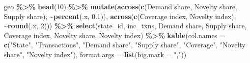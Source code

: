 \documentclass[
]{article}
\newenvironment{Shaded}{\begin{snugshade}}{\end{snugshade}}
\newcommand{\AttributeTok}[1]{\textcolor[rgb]{0.13,0.29,0.53}{#1}}
\newcommand{\DecValTok}[1]{\textcolor[rgb]{0.00,0.00,0.81}{#1}}
\newcommand{\FloatTok}[1]{\textcolor[rgb]{0.00,0.00,0.81}{#1}}
\newcommand{\FunctionTok}[1]{\textcolor[rgb]{0.13,0.29,0.53}{\textbf{#1}}}
\newcommand{\NormalTok}[1]{#1}
\newcommand{\SpecialCharTok}[1]{\textcolor[rgb]{0.81,0.36,0.00}{\textbf{#1}}}
\newcommand{\StringTok}[1]{\textcolor[rgb]{0.31,0.60,0.02}{#1}}
\begin{document}
\begin{Shaded}
\begin{Highlighting}[]
\NormalTok{geo }\SpecialCharTok{\%\textgreater{}\%} \FunctionTok{head}\NormalTok{(}\DecValTok{10}\NormalTok{) }\SpecialCharTok{\%\textgreater{}\%}
  \FunctionTok{mutate}\NormalTok{(}\FunctionTok{across}\NormalTok{(}\FunctionTok{c}\NormalTok{(}\StringTok{\textasciigrave{}}\AttributeTok{Demand share}\StringTok{\textasciigrave{}}\NormalTok{, }\StringTok{\textasciigrave{}}\AttributeTok{Novelty share}\StringTok{\textasciigrave{}}\NormalTok{, }\StringTok{\textasciigrave{}}\AttributeTok{Supply share}\StringTok{\textasciigrave{}}\NormalTok{), }\SpecialCharTok{\textasciitilde{}}\FunctionTok{percent}\NormalTok{(.x, }\FloatTok{0.1}\NormalTok{)),}
         \FunctionTok{across}\NormalTok{(}\FunctionTok{c}\NormalTok{(}\StringTok{\textasciigrave{}}\AttributeTok{Coverage index}\StringTok{\textasciigrave{}}\NormalTok{, }\StringTok{\textasciigrave{}}\AttributeTok{Novelty index}\StringTok{\textasciigrave{}}\NormalTok{), }\SpecialCharTok{\textasciitilde{}}\FunctionTok{round}\NormalTok{(.x, }\DecValTok{2}\NormalTok{))) }\SpecialCharTok{\%\textgreater{}\%}
  \FunctionTok{select}\NormalTok{(state\_id, inc\_txns, }\StringTok{\textasciigrave{}}\AttributeTok{Demand share}\StringTok{\textasciigrave{}}\NormalTok{, }\StringTok{\textasciigrave{}}\AttributeTok{Supply share}\StringTok{\textasciigrave{}}\NormalTok{, }\StringTok{\textasciigrave{}}\AttributeTok{Coverage index}\StringTok{\textasciigrave{}}\NormalTok{,}
         \StringTok{\textasciigrave{}}\AttributeTok{Novelty share}\StringTok{\textasciigrave{}}\NormalTok{, }\StringTok{\textasciigrave{}}\AttributeTok{Novelty index}\StringTok{\textasciigrave{}}\NormalTok{) }\SpecialCharTok{\%\textgreater{}\%}
  \FunctionTok{kable}\NormalTok{(}\AttributeTok{col.names =} \FunctionTok{c}\NormalTok{(}\StringTok{"State"}\NormalTok{, }\StringTok{"Transactions"}\NormalTok{, }\StringTok{"Demand share"}\NormalTok{, }\StringTok{"Supply share"}\NormalTok{,}
                      \StringTok{"Coverage"}\NormalTok{, }\StringTok{"Novelty share"}\NormalTok{, }\StringTok{"Novelty index"}\NormalTok{),}
        \AttributeTok{format.args =} \FunctionTok{list}\NormalTok{(}\AttributeTok{big.mark =} \StringTok{","}\NormalTok{))}
\end{Highlighting}
\end{Shaded}
\end{document}

